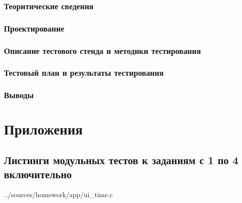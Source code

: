 \documentclass[12pt,a4paper]{report}
\begin{document}
\subsection{Теоритические сведения}
\subsection{Проектирование}
\subsection{Описание тестового стенда и методики тестирования}
\subsection{Тестовый план и результаты тестирования}
\subsection{Выводы}

\chapter*{Приложения}
\section{Листинги модульных тестов к заданиям с 1 по 4 включительно}

{../sources/homework/app/ui_time.c}
\end{document}
